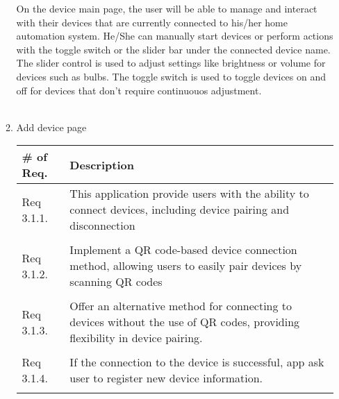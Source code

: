 \begin{enumerate}[label=\arabic*.]
\begin{enumerate}[label*={\arabic*.},ref=\theenumi.\arabic*]

                    On the device main page, the user will be able to manage and interact with their devices that are currently connected to his/her home automation system. He/She can manually start devices or perform actions with the toggle switch or the slider bar under the connected device name. The slider control is used to adjust settings like brightness or volume for devices such as bulbs. The toggle switch is used to toggle devices on and off for devices that don't require continuouos adjustment.  \\\\
                    \newpage
              \item Add device page
                    \begin{table}[H]
                        \center
                        \begin{tabular}{m{1.4cm} m{5.5cm}}
                            \toprule
                            \# of Req. & Description                                                                                                                 \\
                            \midrule
                            Req 3.1.1. & This application provide users with the ability to connect devices, including device pairing and disconnection              \\\\
                            Req 3.1.2. & Implement a QR code-based device connection method, allowing users to easily pair devices by scanning QR codes              \\\\
                            Req 3.1.3. & Offer an alternative method for connecting to devices without the use of QR codes, providing flexibility in device pairing. \\\\
                            Req 3.1.4. & If the connection to the device is successful, app ask user to register new device information. \\\\
                            \bottomrule
                        \end{tabular}
                    \end{table}


\end{enumerate}
\end{enumerate}
